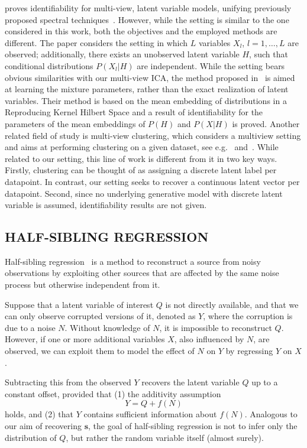 \documentclass[letterpaper]{article}
\theoremstyle{definition}
\begin{document}
\cite{song2014nonparametric} proves identifiability for multi-view, latent variable models, unifying previously proposed spectral techniques~\cite{anandkumar2014tensor}. However, while the setting is similar to the one considered in this work, both the objectives and the employed methods are different.
The paper considers the setting in which $L$ variables $X_l$, $l=1, \ldots, L$ are observed; additionally, there exists an unobserved latent variable $H$, such that conditional distributions $P(X_l|H)$ are independent. While the setting bears obvious similarities with our multi-view ICA, the method proposed in~\cite{song2014nonparametric} is aimed at learning the mixture parameters, rather than the exact realization of latent variables.
Their method is based on the mean embedding of distributions in a Reproducing Kernel Hilbert Space and a result of identifiability for the parameters of the mean embeddings of $P(H)$ and $P(X|H)$ is proved.
Another related field of study is multi-view clustering, which considers a multiview setting and aims at performing clustering on a given dataset, see e.g.~\cite{de2005spectral} and~\cite{kumar2011co}. While related to our setting, this line of work is different from it in two key ways.
Firstly, clustering can be thought of as assigning a discrete latent label per datapoint. In contrast, our setting seeks to recover a continuous latent vector per datapoint.
Second, since no underlying generative model with discrete latent variable is assumed, identifiability results are not given.



\subsection{HALF-SIBLING REGRESSION}
\label{sec:hsr}
Half-sibling regression~\cite{scholkopf2016modeling} is a method to reconstruct a source from noisy observations by exploiting other sources that are affected by the same noise process but otherwise independent from it.

Suppose that a latent variable of interest $Q$ is not directly available, and that we can only observe corrupted versions of it, denoted as  $Y$, where the corruption is due to a noise $N$.
Without knowledge of $N$, it is impossible to reconstruct $Q$. However, if one or more additional variables $X$, also influenced by $N$, are observed, we can exploit them to model the effect of $N$ on $Y$ by regressing $Y$ on $X$.

Subtracting this from the observed $Y$ recovers the latent variable $Q$ up to a constant offset,
provided that (1) the additivity assumption
\[
Y = Q + f(N)
\]
holds, and (2) that $Y$ contains sufficient information about $f(N)$.
Analogous to our aim of recovering $\bm{s}$,
the goal of half-sibling regression is not to infer only the distribution of $Q$, but rather the random variable itself (almost surely).
\end{document}
